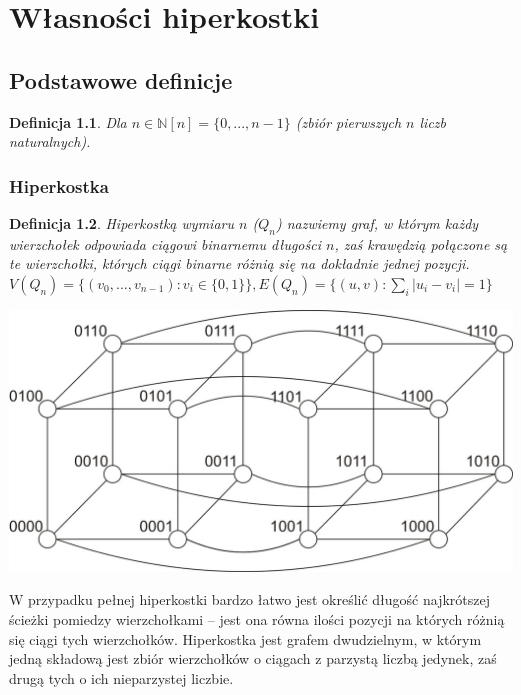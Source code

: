 \documentclass{pracamgr}
\newtheorem{defi}{Definicja}[section] %
\begin{document}
  
  
 \chapter{Własności hiperkostki}
  \section{Podstawowe definicje}
   \begin{defi}\label{[n]}
    Dla $n\in\mathbb{N}$\quad $[n]=\{0,...,n-1\}$ (zbiór pierwszych $n$ liczb naturalnych).
   \end{defi}
   \subsection{Hiperkostka}
    \begin{defi}\label{hiperkostka}
     \emph{Hiperkostką wymiaru $n$ ($Q_n$)} nazwiemy graf, w którym każdy wierzchołek odpowiada ciągowi binarnemu długości $n$,
     zaś krawędzią połączone są te wierzchołki, których ciągi binarne różnią się na dokładnie jednej pozycji.\newline
     $V(Q_n)=\{(v_0,...,v_{n-1}):v_i\in\{0,1\}\}, E(Q_n)=\{(u,v):\sum_{i}|u_i-v_i|=1\}$
    \end{defi}
    \begin{center}
     \includegraphics[scale=0.6]{img/Q_4.jpg}
    \end{center}
    W przypadku pełnej hiperkostki
    bardzo łatwo jest określić długość najkrótszej ścieżki pomiedzy wierzchołkami --
    jest ona równa ilości pozycji na których różnią się ciągi tych wierzchołków.\newline
    Hiperkostka jest grafem dwudzielnym, w którym jedną składową jest zbiór wierzchołków o ciągach z parzystą liczbą jedynek,
    zaś drugą tych o ich nieparzystej liczbie.\newline
\end{document}
